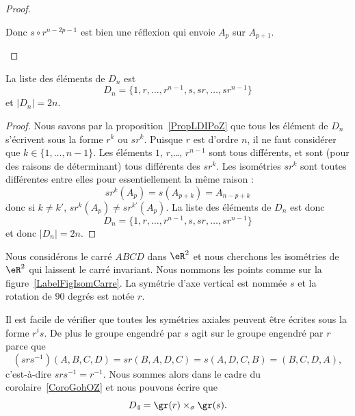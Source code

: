 \begin{proof}
\begin{subproof}
\begin{subproof}
			Donc \( s\circ r^{n-2p-1}\) est bien une réflexion qui envoie \( A_p\) sur \( A_{p+1}\).
		\end{subproof}

	\end{subproof}
\end{proof}

\begin{corollary}   \label{CorWYITsWW}
	La liste des éléments de \( D_n\) est
	\begin{equation}
		D_n=\{ 1,r,\ldots, r^{n-1},s,sr,\ldots, sr^{n-1} \}
	\end{equation}
	et \( | D_n |=2n\).
\end{corollary}

\begin{proof}
	Nous savons par la proposition~\ref{PropLDIPoZ} que tous les élément de \( D_n\) s'écrivent sous la forme \( r^k\) ou \( sr^k\). Puisque \( r\) est d'ordre \( n\), il ne faut considérer que \( k\in\{ 1,\ldots, n-1 \}\). Les éléments \( 1\), \( r\),\ldots, \( r^{n-1}\) sont tous différents, et sont (pour des raisons de déterminant) tous différents des \( sr^k\). Les isométries \( sr^k\) sont toutes différentes entre elles pour essentiellement la même raison :
	\begin{equation}
		sr^k(A_p)=s(A_{p+k})=A_{n-p+k}
	\end{equation}
	donc si \( k\neq k'\), \( sr^k(A_p)\neq sr^{k'}(A_p)\). La liste des éléments de \( D_n\) est donc
	\begin{equation}
		D_n=\{ 1,r,\ldots, r^{n-1},s,sr,\ldots, sr^{n-1} \}
	\end{equation}
	et donc \( | D_n |=2n\).
\end{proof}

\begin{example}     \label{EXooHNYYooUDsKnm}
	Nous considérons le carré \( ABCD\) dans \( \eR^2\) et nous cherchons les isométries de \( \eR^2\) qui laissent le carré invariant. Nous nommons les points comme sur la figure~\ref{LabelFigIsomCarre}. La symétrie d'axe vertical est nommée \( s\) et la rotation de \( 90\) degrés est notée \( r\).
	\newcommand{\CaptionFigIsomCarre}{Le carré dont nous étudions le groupe diédral.}
	

	Il est facile de vérifier que toutes les symétries axiales peuvent être écrites sous la forme \( r^is\). De plus le groupe engendré par \( s\) agit sur le groupe engendré par \( r\) parce que
	\begin{equation}
		(srs^{-1})(A,B,C,D)=sr(B,A,D,C)=s(A,D,C,B)=(B,C,D,A),
	\end{equation}
	c'est-à-dire \( srs^{-1}=r^{-1}\). Nous sommes alors dans le cadre du corolaire~\ref{CoroGohOZ} et nous pouvons écrire que
	\begin{equation}
		D_4=\gr(r)\times_{\sigma}\gr(s).
	\end{equation}
\end{example}

